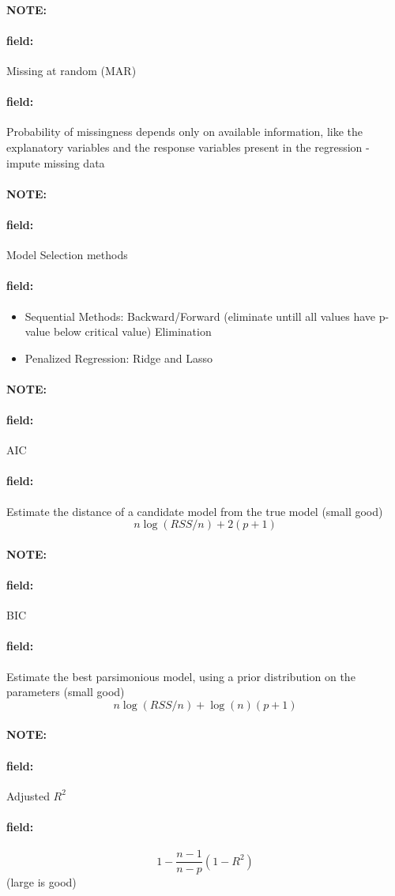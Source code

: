 \documentclass[12pt]{article}
\newenvironment{note}{\paragraph{NOTE:}}{}
\newenvironment{field}{\paragraph{field:}}{}
\begin{document}
\begin{note}
  \begin{field}
    Missing at random (MAR)
  \end{field}
  \begin{field}
    Probability of missingness depends only on available information, like the explanatory variables and the response variables present in the regression - impute missing data
  \end{field}
\end{note}

\begin{note}
  \begin{field}
    Model Selection methods
  \end{field}
  \begin{field}
    \begin{itemize}
      \item Sequential Methods: Backward/Forward (eliminate untill all values have p-value below critical value) Elimination
      \item Penalized Regression: Ridge and Lasso
    \end{itemize}
  \end{field}
\end{note}

\begin{note}
  \begin{field}
    AIC
  \end{field}
  \begin{field}
    Estimate the distance of a candidate model from the true model (small good)
    $$ n \log (RSS/n) + 2(p+1)$$
  \end{field}
\end{note}


\begin{note}
  \begin{field}
    BIC
  \end{field}
  \begin{field}
    Estimate the best parsimonious model, using a prior distribution on the parameters (small good)
    $$  n \log (RSS/n) + \log(n)(p+1)$$
  \end{field}
\end{note}


\begin{note}
  \begin{field}
    Adjusted $R^2$
  \end{field}
  \begin{field}
    $$ 1 - \frac{n-1}{n-p}(1 - R^2)$$ (large is good)
  \end{field}
\end{note}
\end{document}
